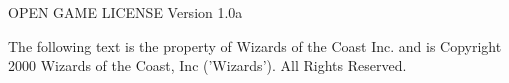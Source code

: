\newpage

OPEN GAME LICENSE  Version 1.0a

The following text is the property of Wizards of the Coast Inc. and is Copyright 2000 Wizards of the Coast, Inc ('Wizards'). All Rights Reserved.


